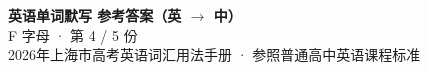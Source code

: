 \documentclass[10pt,a4paper]{article}
\begin{document}
\pagestyle{plain}

\begin{center}
{\LARGE\bfseries 英语单词默写 \quad 参考答案（英 $\to$ 中）}\\[0.22em]
{\large F 字母 · 第 4 / 5 份}\\[0.18em]
{\small 2026年上海市高考英语词汇用法手册 · 参照普通高中英语课程标准}
\end{center}

\vspace{0.2em}
\noindent{\color{rulegray}\rule{\textwidth}{0.8pt}}

\vspace{0.35em}

\vspace{0.25em}
\renewcommand{\arraystretch}{1.32}
\end{document}
